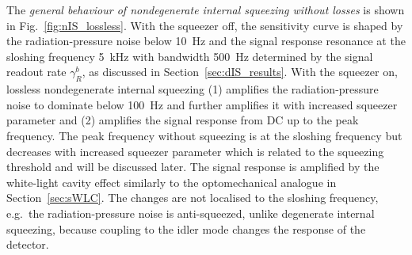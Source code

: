 The \emph{general behaviour of nondegenerate internal squeezing without losses} is shown in Fig.~\ref{fig:nIS_lossless}. %
With the squeezer off, the sensitivity curve is shaped by the radiation-pressure noise below 10~Hz and the signal response resonance at the sloshing frequency 5~kHz with bandwidth 500~Hz determined by the signal readout rate $\gamma^b_R$, as discussed in Section~\ref{sec:dIS_results}.
With the squeezer on, lossless nondegenerate internal squeezing (1) amplifies the radiation-pressure noise to dominate below 100~Hz and further amplifies it with increased squeezer parameter and (2) amplifies the signal response from DC up to the peak frequency. The peak frequency without squeezing is at the sloshing frequency but decreases with increased squeezer parameter which is related to the squeezing threshold and will be discussed later.
The signal response is amplified by the white-light cavity effect similarly to the optomechanical analogue in Section~\ref{sec:sWLC}. %
The changes are not localised to the sloshing frequency, e.g.\ the radiation-pressure noise is anti-squeezed, unlike degenerate internal squeezing, because coupling to the idler mode changes the response of the detector.


\label{sec:nIS_general_behaviour}

